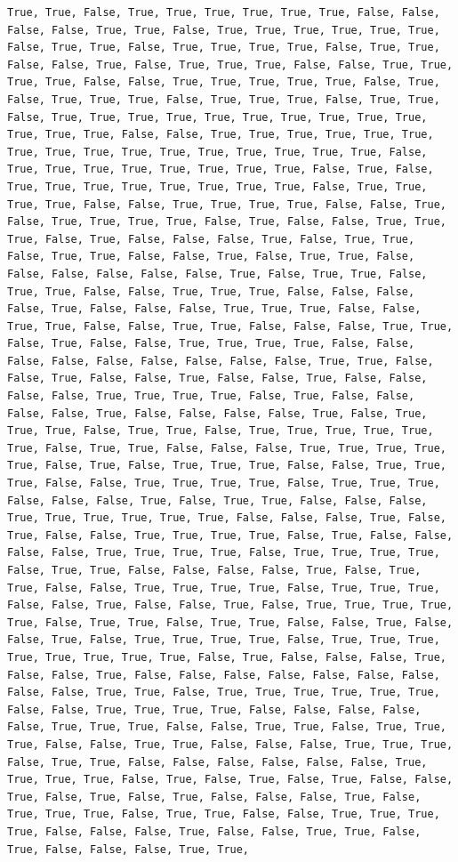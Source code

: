 \documentclass[
  letterpaper,
  DIV=11,
  numbers=noendperiod]{scrartcl}
\begin{document}
\begin{verbatim}
True, True, False, True, True, True, True, True, True, False, False, False, False, True, True, False, True, True, True, True, True, True, False, True, True, False, True, True, True, True, False, True, True, False, False, True, False, True, True, True, False, False, True, True, True, True, False, False, True, True, True, True, True, False, True, False, True, True, True, False, True, True, True, False, True, True, False, True, True, True, True, True, True, True, True, True, True, True, True, True, False, False, True, True, True, True, True, True, True, True, True, True, True, True, True, True, True, True, False, True, True, True, True, True, True, True, True, False, True, False, True, True, True, True, True, True, True, True, False, True, True, True, True, False, False, True, True, True, True, False, False, True, False, True, True, True, True, False, True, False, False, True, True, True, False, True, False, False, False, True, False, True, True, False, True, True, False, False, True, False, True, True, False, False, False, False, False, False, True, False, True, True, False, True, True, False, False, True, True, True, False, False, False, False, True, False, False, False, True, True, True, False, False, True, True, False, False, True, True, False, False, False, True, True, False, True, False, False, True, True, True, True, False, False, False, False, False, False, False, False, False, True, True, False, False, True, False, False, True, False, False, True, False, False, False, False, True, True, True, True, False, True, False, False, False, False, True, False, False, False, False, True, False, True, True, True, False, True, True, False, True, True, True, True, True, True, False, True, True, False, False, False, True, True, True, True, True, False, True, False, True, True, True, False, False, True, True, True, False, False, True, True, True, True, False, True, True, True, False, False, False, True, False, True, True, False, False, False, True, True, True, True, True, True, False, False, False, True, False, True, False, False, True, True, True, True, False, True, False, False, False, False, True, True, True, True, False, True, True, True, True, False, True, True, False, False, False, False, True, False, True, True, False, False, True, True, True, True, False, True, True, True, False, False, True, False, False, True, False, True, True, True, True, True, False, True, True, False, True, True, False, False, True, False, False, True, False, True, True, True, True, False, True, True, True, True, True, True, True, True, False, True, False, False, False, True, False, False, True, False, False, False, False, False, False, False, False, False, True, True, False, True, True, True, True, True, True, False, False, True, True, True, True, False, False, False, False, False, True, True, True, False, False, True, True, False, True, True, True, False, False, True, True, False, False, False, True, True, True, False, True, True, False, False, False, False, False, False, True, True, True, True, False, True, False, True, False, True, False, False, True, False, True, False, True, False, False, False, True, False, True, True, True, False, True, True, False, False, True, True, True, True, False, False, False, True, False, False, True, True, False, True, False, False, False, True, True, 
\end{verbatim}
\end{document}
